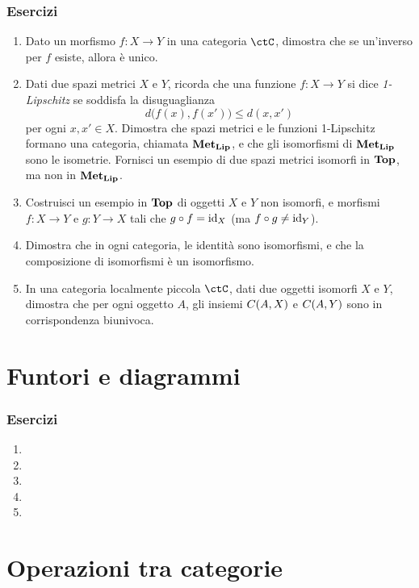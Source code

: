 \subsubsection*{Esercizi}
\begin{enumerate}
    \item Dato un morfismo $f:X\to Y$ in una categoria $\ctC$, dimostra che se un'inverso per $f$ esiste, allora è unico.
    \item Dati due spazi metrici $X$ e $Y$, ricorda che una funzione $f:X\to Y$ si dice \emph{1-Lipschitz} se soddisfa la disuguaglianza
    $$
     d\big( f(x), f(x') \big) \le d(x,x')
    $$
    per ogni $x,x'\in X$. Dimostra che spazi metrici e le funzioni 1-Lipschitz formano una categoria, chiamata $\mathbf{Met}_{\mathbf{Lip}}$, e che gli isomorfismi di $\mathbf{Met}_{\mathbf{Lip}}$ sono le isometrie. Fornisci un esempio di due spazi metrici isomorfi in $\mathbf{Top}$, ma non in $\mathbf{Met}_{\mathbf{Lip}}$.
    \item Costruisci un esempio in $\mathbf{Top}$ di oggetti $X$ e $Y$ non isomorfi, e morfismi $f:X\to Y$ e $g:Y\to X$ tali che $g\circ f=\mathrm{id}_X$ (ma $f\circ g \ne \mathrm{id}_Y$). 
    \item Dimostra che in ogni categoria, le identità sono isomorfismi, e che la composizione di isomorfismi è un isomorfismo. 
    \item In una categoria localmente piccola $\ctC$, dati due oggetti isomorfi $X$ e $Y$, dimostra che per ogni oggetto $A$, gli insiemi $C(A,X)$ e $C(A,Y)$ sono in corrispondenza biunivoca.
\end{enumerate}


\section{Funtori e diagrammi}

\subsubsection*{Esercizi}
\begin{enumerate}
    \item 
    \item 
    \item 
    \item 
    \item 
\end{enumerate}


\section{Operazioni tra categorie}

